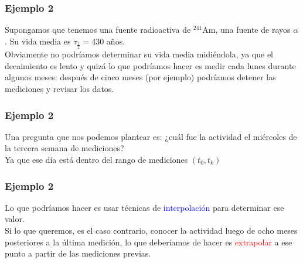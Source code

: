 \begin{frame}
\frametitle{Ejemplo 2}
Supongamos que tenemos una fuente radioactiva de {}$^{241}$Am, una fuente de rayos $\alpha$. Su vida media es $\tau_{\frac{1}{2}}=430$ años.
\\
\bigskip
Obviamente no podríamos determinar su vida media midiéndola, ya que el decaimiento es lento y quizá lo que podríamos hacer es medir cada lunes durante algunos meses: después de cinco meses (por ejemplo) podríamos detener las mediciones y revisar los datos.
\end{frame}
\begin{frame}
\frametitle{Ejemplo 2}
Una pregunta que nos podemos plantear es: ¿cuál fue la actividad el miércoles de la tercera semana de mediciones? 
\\
\bigskip
Ya que ese día está dentro del rango de mediciones $(t_{0}, t_{k})$
\end{frame}
\begin{frame}
\frametitle{Ejemplo 2}
Lo que podríamos hacer es usar técnicas de \textcolor{blue}{interpolación} para determinar ese valor.  
\\
\bigskip
\pause
Si lo que queremos, es el caso contrario, conocer la actividad luego de ocho meses posteriores a la última medición, lo que deberíamos de hacer es \textcolor{red}{extrapolar} a ese punto a partir de las mediciones previas.
\end{frame}

